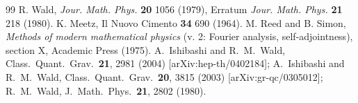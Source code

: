 \documentclass[aps,floats,showpacs,amssymb,tightenlines]{revtex4}
\begin{document}
\begin{thebibliography}{99}
 R. Wald, {\em Jour. Math. Phys.} {\bf 20} 1056 (1979), Erratum
{\em Jour. Math. Phys.} {\bf 21} 218 (1980).
K. Meetz, Il Nuovo Cimento {\bf 34} 690 (1964).
   M. Reed and B. Simon, {\em  Methods of modern mathematical physics} (v. 2: Fourier
  analysis, self-adjointness), section X,
  Academic Press (1975).
  A.~Ishibashi and R.~M.~Wald,
  Class.\ Quant.\ Grav.\  {\bf 21}, 2981 (2004)
  [arXiv:hep-th/0402184]; 
  A.~Ishibashi and R.~M.~Wald,
  Class.\ Quant.\ Grav.\  {\bf 20}, 3815 (2003)
  [arXiv:gr-qc/0305012]; 
  R.~M.~Wald,
  J.\ Math.\ Phys.\  {\bf 21}, 2802 (1980).




\end{thebibliography}
\end{document}
